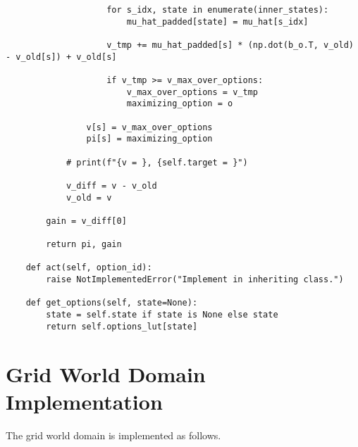 \begin{verbatim}
                    for s_idx, state in enumerate(inner_states):
                        mu_hat_padded[state] = mu_hat[s_idx]

                    v_tmp += mu_hat_padded[s] * (np.dot(b_o.T, v_old) - v_old[s]) + v_old[s]

                    if v_tmp >= v_max_over_options:
                        v_max_over_options = v_tmp
                        maximizing_option = o

                v[s] = v_max_over_options
                pi[s] = maximizing_option

            # print(f"{v = }, {self.target = }")

            v_diff = v - v_old
            v_old = v

        gain = v_diff[0]

        return pi, gain

    def act(self, option_id):
        raise NotImplementedError("Implement in inheriting class.")

    def get_options(self, state=None):
        state = self.state if state is None else state
        return self.options_lut[state]
\end{verbatim}

\chapter{Grid World Domain Implementation}

The grid world domain is implemented as follows.

